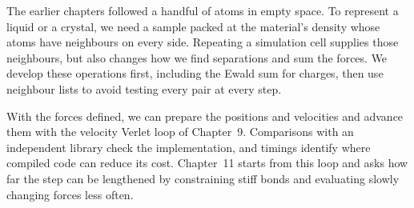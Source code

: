 The earlier chapters followed a handful of atoms in empty space. To
represent a liquid or a crystal, we need a sample packed at the material's
density whose atoms have neighbours on every side. Repeating a simulation
cell supplies those neighbours, but also changes how we find separations
and sum the forces. We develop these operations first, including the
Ewald sum for charges, then use neighbour lists to avoid testing every
pair at every step.

With the forces defined, we can prepare the positions and velocities and
advance them with the velocity Verlet loop of Chapter~9. Comparisons with
an independent library check the implementation, and timings identify
where compiled code can reduce its cost. Chapter~11 starts from this loop
and asks how far the step can be lengthened by constraining stiff bonds
and evaluating slowly changing forces less often.
